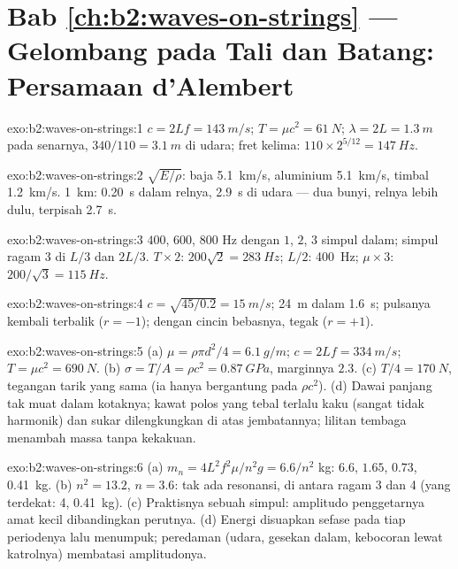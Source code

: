 \section*{Bab \ref{ch:b2:waves-on-strings} --- Gelombang pada Tali dan Batang: Persamaan d'Alembert}

\begin{solution}{exo:b2:waves-on-strings:1}
$c = 2Lf = \qty{143}{m/s}$; $T = \mu c^2 = \qty{61}{N}$; $\lambda = 2L = \qty{1.3}{m}$ pada
senarnya, $340/110 = \qty{3.1}{m}$ di udara; fret kelima: $110 \times 2^{5/12} =
\qty{147}{Hz}$.
\end{solution}

\begin{solution}{exo:b2:waves-on-strings:2}
$\sqrt{E/\rho}$: baja \qty{5.1}{km/s}, aluminium \qty{5.1}{km/s}, timbal
\qty{1.2}{km/s}. \qty{1}{km}: \qty{0.20}{s} dalam relnya, \qty{2.9}{s} di udara ---
dua bunyi, relnya lebih dulu, terpisah \qty{2.7}{s}.
\end{solution}

\begin{solution}{exo:b2:waves-on-strings:3}
$400$, $600$, $800$ Hz dengan $1$, $2$, $3$ simpul dalam; simpul ragam 3 di
$L/3$ dan $2L/3$. $T \times 2$: $200\sqrt2 = \qty{283}{Hz}$; $L/2$: \qty{400}{Hz}; $\mu
\times 3$: $200/\sqrt3 = \qty{115}{Hz}$.
\end{solution}

\begin{solution}{exo:b2:waves-on-strings:4}
$c = \sqrt{45/0.2} = \qty{15}{m/s}$; \qty{24}{m} dalam \qty{1.6}{s}; pulsanya kembali
terbalik ($r = -1$); dengan cincin bebasnya, tegak ($r = +1$).
\end{solution}

\begin{solution}{exo:b2:waves-on-strings:5}
(a) $\mu = \rho\pi d^2/4 = \qty{6.1}{g/m}$; $c = 2Lf = \qty{334}{m/s}$; $T = \mu c^2 =
\qty{690}{N}$. (b) $\sigma = T/A = \rho c^2 = \qty{0.87}{GPa}$, marginnya $2.3$. (c) $T/4 =
\qty{170}{N}$, tegangan tarik yang sama (ia hanya bergantung pada $\rho c^2$). (d) Dawai
panjang tak muat dalam kotaknya; kawat polos yang tebal terlalu kaku (sangat
tidak harmonik) dan sukar dilengkungkan di atas jembatannya; lilitan tembaga menambah massa
tanpa kekakuan.
\end{solution}

\begin{solution}{exo:b2:waves-on-strings:6}
(a) $m_n = 4L^2f^2\mu/n^2g = 6.6/n^2$ kg: $6.6$, $1.65$, $0.73$, \qty{0.41}{kg}. (b)
$n^2 = 13.2$, $n = 3.6$: tak ada resonansi, di antara ragam 3 dan 4 (yang terdekat: 4,
\qty{0.41}{kg}). (c) Praktisnya sebuah simpul: amplitudo penggetarnya amat kecil
dibandingkan perutnya. (d) Energi disuapkan sefase pada tiap periodenya lalu
menumpuk; peredaman (udara, gesekan dalam, kebocoran lewat
katrolnya) membatasi amplitudonya.
\end{solution}

